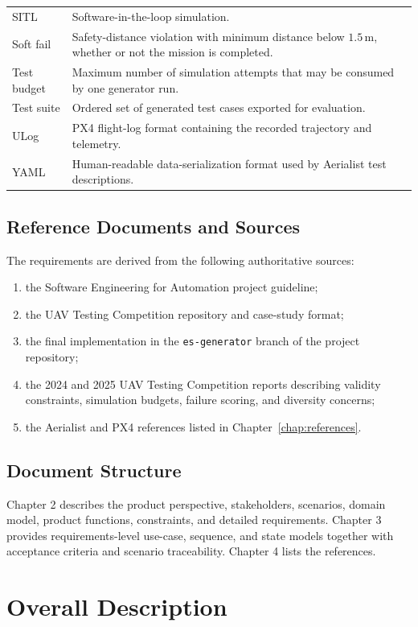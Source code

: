 \documentclass[11pt,a4paper]{report}
\begin{document}
\begin{longtable}{L{3.3cm} L{11.5cm}}
SITL & Software-in-the-loop simulation.\\
Soft fail & Safety-distance violation with minimum distance below $1.5\,\mathrm{m}$, whether or not the mission is completed.\\
Test budget & Maximum number of simulation attempts that may be consumed by one generator run.\\
Test suite & Ordered set of generated test cases exported for evaluation.\\
ULog & PX4 flight-log format containing the recorded trajectory and telemetry.\\
YAML & Human-readable data-serialization format used by Aerialist test descriptions.\\
\bottomrule
\end{longtable}

\section{Reference Documents and Sources}
The requirements are derived from the following authoritative sources:
\begin{enumerate}
  \item the Software Engineering for Automation project guideline;
  \item the UAV Testing Competition repository and case-study format;
  \item the final implementation in the \texttt{es-generator} branch of the project repository;
  \item the 2024 and 2025 UAV Testing Competition reports describing validity constraints, simulation budgets, failure scoring, and diversity concerns;
  \item the Aerialist and PX4 references listed in Chapter~\ref{chap:references}.
\end{enumerate}

\section{Document Structure}
Chapter 2 describes the product perspective, stakeholders, scenarios, domain model, product functions, constraints, and detailed requirements. Chapter 3 provides requirements-level use-case, sequence, and state models together with acceptance criteria and scenario traceability. Chapter 4 lists the references.

\chapter{Overall Description}
\end{document}
